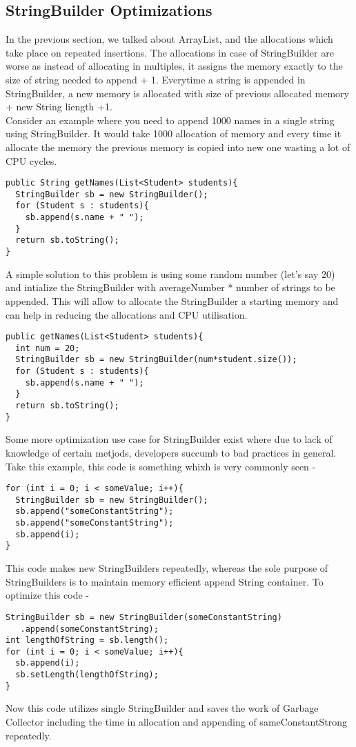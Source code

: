 \documentclass[journal]{IEEEtran}
\begin{document}
\newpage

\subsection{StringBuilder Optimizations}
In the previous section, we talked about ArrayList, and the allocations which take place on repeated insertions. The allocations in case of StringBuilder are worse as instead of allocating in multiples, it assigns the memory exactly to the size of string needed to append + 1. Everytime a string is appended in StringBuilder, a new memory is allocated with size of previous allocated memory + new String liength +1.\\
Consider an example where you need to append 1000 names in a single string using StringBuilder. It would take 1000 allocation of memory and every time it allocate the memory the previous memory is copied into new one wasting a lot of CPU cycles.
\begin{verbatim}
public String getNames(List<Student> students){
  StringBuilder sb = new StringBuilder();
  for (Student s : students){
    sb.append(s.name + " ");
  }
  return sb.toString();
}
\end{verbatim}
A simple solution to this problem is using some random number (let's say 20) and intialize the StringBuilder with averageNumber * number of strings to be appended. This will allow to allocate the StringBuilder a starting memory and can help in reducing the allocations and CPU utilisation.
\begin{verbatim}
public getNames(List<Student> students){
  int num = 20;
  StringBuilder sb = new StringBuilder(num*student.size());
  for (Student s : students){
    sb.append(s.name + " ");
  }
  return sb.toString();
}
\end{verbatim}
Some more optimization use case for StringBuilder exist where due to lack of knowledge of certain metjods, developers succumb to bad practices in general. Take this example, this code is something whixh is very commonly seen -
\begin{verbatim}
for (int i = 0; i < someValue; i++){
  StringBuilder sb = new StringBuilder();
  sb.append("someConstantString");
  sb.append("someConstantString");
  sb.append(i);
}
\end{verbatim}
This code makes new StringBuilders repeatedly, whereas the sole purpose of StringBuilders is to maintain memory efficient append String container. To optimize this code - 
\begin{verbatim}
StringBuilder sb = new StringBuilder(someConstantString)
   .append(someConstantString);
int lengthOfString = sb.length();
for (int i = 0; i < someValue; i++){
  sb.append(i);
  sb.setLength(lengthOfString);
}
\end{verbatim}
Now this code utilizes single StringBuilder and saves the work of Garbage Collector including the time in allocation and appending of sameConstantStrong repeatedly.
\end{document}
